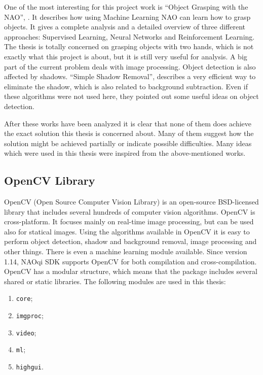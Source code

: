     One of the most interesting for this project work is ``Object Grasping with the NAO'', \cite{objectGrasping}. It describes how using Machine Learning NAO can learn how to grasp objects. It gives a complete analysis and a detailed overview of three different approaches: Supervised Learning, Neural Networks and Reinforcement Learning. The thesis is totally concerned on grasping objects with two hands, which is not exactly what this project is about, but it is still very useful for analysis. 
A big part of the current problem deals with image processing. Object detection is also affected by shadows. ``Simple Shadow Removal'', \cite{shadowRemoval} describes a very efficient way to eliminate the shadow, which is also related to background subtraction. Even if these algorithms were not used here, they pointed out some useful ideas on object detection. 
    
    After these works have been analyzed it is clear that none of them does achieve the exact solution this thesis is concerned about. Many of them suggest how the solution might be achieved partially or indicate possible difficulties. Many ideas which were used in this thesis were inspired from the above-mentioned works.
\subsection{OpenCV Library}
    OpenCV (Open Source Computer Vision Library) is an open-source BSD-licensed library that includes several hundreds of computer vision algorithms. OpenCV is cross-platform. It focuses mainly on real-time image processing, but can be used also for statical images. Using the algorithms available in OpenCV it is easy to perform object detection, shadow and background removal, image processing and other things. There is even a machine learning module available. Since version 1.14, NAOqi SDK supports OpenCV for both compilation and cross-compilation. OpenCV has a modular structure, which means that the package includes several shared or static libraries. The following modules are used in this thesis:
    \begin{enumerate}[topsep=3pt, partopsep=0pt,itemsep=0pt,parsep=1pt]
        \item \verb|core|;
        \item \verb|imgproc|;
        \item \verb|video|;
        \item \verb|ml|;
        \item \verb|highgui|.
    \end{enumerate}

